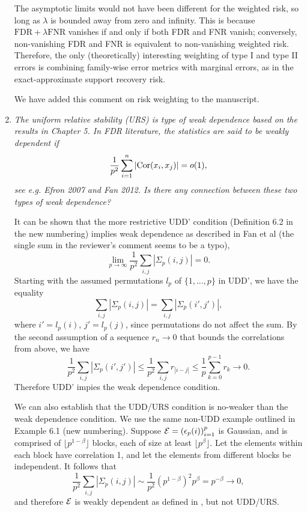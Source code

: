 \documentclass[11pt]{article}
\begin{document}
\begin{enumerate}
    The asymptotic limits would not have been different for the weighted risk, so long as $\lambda$ is bounded away from zero and infinity.
    This is because $\textrm{FDR} + \lambda\textrm{FNR}$ vanishes if and only if both FDR and FNR vanish; conversely, non-vanishing FDR and FNR is equivalent to non-vanishing weighted risk.
    Therefore, the only (theoretically) interesting weighting of type I and type II errors is combining family-wise error metrics with marginal errors, as in the exact-approximate support recovery risk.
    
    We have added this comment on risk weighting to the manuscript.
    
    \item {\em The uniform relative stability (URS) is type of weak dependence based on the results in Chapter 5. In FDR literature, the statistics are 
    said to be weakly dependent if 
    $$
    \frac{1}{p^2} \sum_{i=1}^n |{\rm Cor}(x_i,x_j)| = o(1),
    $$
    see e.g. Efron 2007 and Fan 2012. Is there any connection between these two types of weak dependence?}

    It can be shown that the more restrictive UDD' condition (Definition 6.2 in the new numbering) implies weak dependence as described in Fan et al \cite{fan:xu:gu:2012} (the single sum in the reviewer's comment seems to be a typo),
    $$
    \lim_{p\to\infty}\frac{1}{p^2} \sum_{i,j} |\Sigma_p(i,j)| = 0.
    $$
    Starting with the assumed permutations $l_p$ of $\{1, . . . , p\}$ in UDD', we have the equality
    $$
    \sum_{i,j} |\Sigma_p(i,j)| = \sum_{i,j} |\Sigma_p(i',j')|,
    $$
    where $i'= l_p(i)$, $j'= l_p(j)$, since permutations do not affect the sum.
    By the second assumption of a sequence $r_n\to0$ that bounds the correlations from above, we have
    $$
    \frac{1}{p^2} \sum_{i,j} |\Sigma_p(i',j')| \le \frac{1}{p^2} \sum_{i,j} r_{|i-j|} \le \frac{1}{p} \sum_{k=0}^{p-1} r_{k} \to 0.
    $$
    Therefore UDD' impies the weak dependence condition.
    
    \medskip
    We can also establish that the UDD/URS condition is no-weaker than the weak dependence condition.
    We use the same non-UDD example outlined in Example 6.1 (new numbering).
    Suppose ${\cal E} = \left(\epsilon_p(i)\right)_{i=1}^p$ is Gaussian, and is comprised of $\lfloor p^{1-\beta}\rfloor$ blocks, each of size at least $\lfloor p^\beta \rfloor$.  Let the elements within each block have correlation 1, and let the elements from different blocks be independent. 
    It follows that 
    $$
    \frac{1}{p^2} \sum_{i,j} |\Sigma_p(i,j)| \sim \frac{1}{p^2} (p^{1-\beta})^2 p^{\beta} = p^{-\beta} \to 0,
    $$
    and therefore ${\cal E}$ is weakly dependent as defined in \cite{fan:xu:gu:2012}, but not UDD/URS.
    

\end{enumerate}
\end{document}
